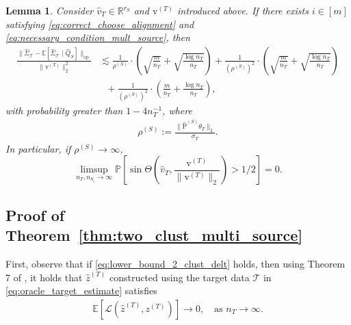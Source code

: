 \documentclass[10pt]{article}
\newtheorem{lemma}{Lemma}
\newcommand{\R}{\mathbb R}
\newcommand{\Pbb}{\mathbb P}
\newcommand{\Ebb}{\mathbb E}
\newcommand{\op}{\mathrm{op}}
\newcommand{\wh}{\widehat}
\newcommand{\calL}{\mathcal L}
\newcommand{\calT}{\mathcal T}
\newcommand{\trg}{T}
\newcommand{\thetaT}{\theta_{\trg}}
\newcommand{\nT}{n_{\trg}}
\newcommand{\sigmaT}{\sigma_{\trg}}
\newcommand{\ztar}{z^{(\trg)}}
\newcommand{\hatztar}{\wh{z}^{(\trg)}}
\newcommand{\DeltaT}{\Delta_{\trg}}
\newcommand{\rmqv}{\mathrm{v}^{(\trg)}}
\newcommand{\src}{S}
\newcommand{\nSm}[1]{n_{\src_{#1}}}
\newcommand{\DeltaSm}[1]{\Delta_{\src_{#1}}}
\begin{document}
\begin{lemma}
    \label{lem:alignment_v_trg}
    Consider $\wh v_{\trg}\in\R^{r_{\src}}$ and $\rmqv$ introduced above. If there exists $i \in [m]$ satisfying \eqref{eq:correct_choose_alignment} and \eqref{eq:necessary_condition_mult_source},
then
    \begin{align}
\label{eq:relative_perturbation}
    \frac{\|\wh\Sigma_\calT-\Ebb[\wh\Sigma_{\calT}\mid\wh Q_\src]\|_{\op}}{\|\rmqv\|_2^2}&\lesssim\frac{1}{\rho^{(\src)}}\cdot\left(\sqrt{\frac{m}{\nT}}+\sqrt{\frac{\log\nT}{\nT}}\right)+\frac{1}{(\rho^{(\src)})^2}\cdot\left(\sqrt{\frac{m}{\nT}}+\sqrt{\frac{\log\nT}{\nT}}\right)\\
    &~~~+\frac{1}{(\rho^{(\src)})^2}\cdot\left(\frac{m}{\nT}+\frac{\log\nT}{\nT}\right),
\end{align}
with probability greater than $1-4n^{-1}_T$, where
\begin{align}
\label{eq:def_rho_s}
\rho^{(\src)}:=\frac{\|\wh{\mathrm P}^{(\src)}\thetaT\|_2}{\sigmaT}.
\end{align}
In particular, if $\rho^{(\src)} \to \infty$,
\[
\limsup_{\nT,\nSm{i} \to \infty} \Pbb\left[\sin\Theta\left(\wh v_\trg,\frac{\rmqv}{\|\rmqv\|_2}\right)>1/2\right]=0.
\]
\end{lemma}

\subsection{Proof of Theorem~\ref{thm:two_clust_multi_source}}
First, observe that if \eqref{eq:lower_bound_2_clust_delt} holds, then using Theorem 7 of \cite{Ndaoud2022}, it holds that $\hatztar$ constructed using the target data $\calT$ in \eqref{eq:oracle_target_estimate} satisfies
\begin{align}
    \mathbb E[\calL(\hatztar,\ztar)] \to 0, \quad \mbox{as $\nT \to \infty$.}
\end{align}
\end{document}
